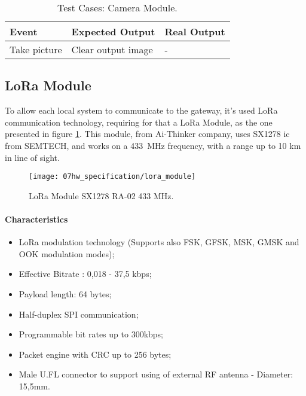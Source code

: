 \begin{table}[H]
	\centering
	\resizebox{\columnwidth}{!}
	{
	\begin{tabular}{|m{3cm}|m{5cm}||m{5cm}|}
		\hline
		\textbf{Event} & \textbf{Expected Output} & \textbf{Real Output}
		\\\hline\hline
		Take picture & Clear output image & -
		\\\hline
	\end{tabular}
	}
	\caption{Test Cases: Camera Module.}
	\label{table:test_camera}
\end{table}
\clearpage
\subsection{LoRa Module}
To allow each local system to communicate to the gateway, it's used LoRa communication technology, requiring for that a LoRa Module, as the one presented in figure \ref{fig:lora_module}. This module, from Ai-Thinker company, uses SX1278 \ac{ic} from SEMTECH, and works on a 433~MHz frequency, with a range up to 10 km in line of sight. \cite{sx1278} \cite{lora_module}

\begin{figure}[H]
	\centering
	\texttt{[image: 07hw\_specification/lora\_module]}
	\caption{LoRa Module SX1278 RA-02 433 MHz.}
	\label{fig:lora_module}
\end{figure}

\paragraph*{Characteristics}
\begin{itemize}
	\item LoRa modulation technology (Supports also FSK, GFSK, MSK, GMSK and OOK modulation modes);
	\item Effective Bitrate : 0,018 - 37,5 kbps;
	\item Payload length: 64 bytes;
	\item Half-duplex SPI communication;
	\item Programmable bit rates up to 300kbps;
	\item Packet engine with CRC up to 256 bytes;
	\item Male U.FL connector to support using of external RF antenna - Diameter: 15,5mm.
\end{itemize}

